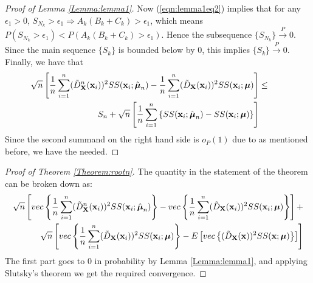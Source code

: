 \begin{proof}[Proof of Lemma \ref{Lemma:lemma1}]
Now (\ref{eqn:lemma1eq2}) implies that for any $\epsilon_1 > 0$, $S_{N_k} > \epsilon_1 \Rightarrow A_k (B_k + C_k) > \epsilon_1$, which means $ P(S_{N_k} > \epsilon_1) < P(A_k (B_k + C_k) > \epsilon_1)$. Hence the subsequence $\{S_{N_k}\} \stackrel{P}{\rightarrow} 0$. Since the main sequence $\{S_k\}$ is bounded below by 0, this implies $\{S_k\} \stackrel{P}{\rightarrow} 0$. Finally, we have that
%
\begin{eqnarray}
\sqrt n \left[
\frac{1}{n} \sum_{i=1}^n (\tilde D^n_{\mathbf{X}} ({\bf{x}}_i))^2 SS({\bf{x}}_i; \hat{{\boldsymbol{\mu}}}_n) -
\frac{1}{n} \sum_{i=1}^n (\tilde D_{\mathbf{X}} ({\bf{x}}_i))^2 SS({\bf{x}}_i; {\boldsymbol{\mu}}) \right] &\leq & \hspace{1em} \notag\\
S_n +  \sqrt{n} \left[ \frac{1}{n} \sum_{i=1}^{n} \left\{ SS({\bf{x}}_i; \hat{{\boldsymbol{\mu}}}_{n}) - SS({\bf{x}}_i; {\boldsymbol{\mu}}) \right\} \right] &&
\end{eqnarray}
%
Since the second summand on the right hand side is $o_P(1)$ due to \cite{durre14} as mentioned before, we have the needed.
\end{proof}

\begin{proof}[Proof of Theorem \ref{Theorem:rootn}]
The quantity in the statement of the theorem can be broken down as:
%
\begin{eqnarray*}
\sqrt n \left[ vec\left\{ \frac{1}{n} \sum_{i=1}^n (\tilde D^n_{\mathbf{X}} ({\bf{x}}_i))^2 SS({\bf{x}}_i; \hat{{\boldsymbol{\mu}}}_n) \right\} - vec\left\{ \frac{1}{n} \sum_{i=1}^n (\tilde D_{\mathbf{X}} ({\bf{x}}_i))^2 SS({\bf{x}}_i; {\boldsymbol{\mu}}) \right\} \right] +\\
\sqrt n \left[ vec\left\{ \frac{1}{n} \sum_{i=1}^n (\tilde D_{\mathbf{X}} ({\bf{x}}_i))^2 SS({\bf{x}}_i; {\boldsymbol{\mu}}) \right\} - E \left[ vec\left\{ (\tilde D_{\mathbf{X}} ({\bf{x}}))^2 SS({\bf{x}}; {\boldsymbol{\mu}}) \right\} \right] \right]
\end{eqnarray*}
%
The first part goes to 0 in probability by Lemma \ref{Lemma:lemma1}, and applying Slutsky's theorem we get the required convergence.
\end{proof}

